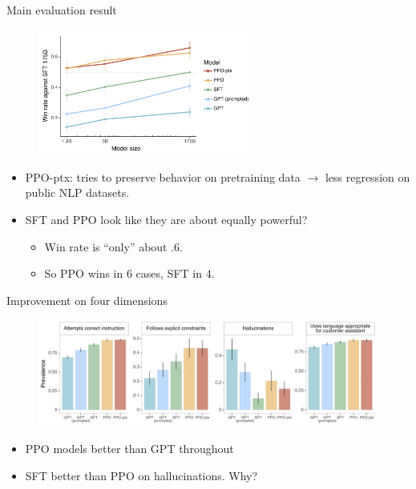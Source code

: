 \begin{vbframe}{Main evaluation result}

\vfill

\begin{figure}
\centering
\includegraphics[width = 7cm]{figure/mainresult.png}
\end{figure}

\begin{itemize}
	\item PPO-ptx: tries to preserve behavior on
	pretraining data $\rightarrow$ less regression on
	public NLP datasets.
	\item SFT and PPO look like they are about equally
	powerful?
\begin{itemize}
        \item Win rate is ``only'' about .6.
        \item So PPO wins in 6 cases, SFT in 4.
\end{itemize}
\end{itemize}

\vfill

\end{vbframe}

\begin{vbframe}{Improvement on four dimensions}

\vfill

\begin{figure}
\centering
\includegraphics[width = 12cm]{figure/evaluationon4categories.png}
\end{figure}

\begin{itemize}
	\item PPO models better than GPT throughout
	\item SFT better than PPO on hallucinations. \ques  Why?
\end{itemize}

\vfill

\end{vbframe}

